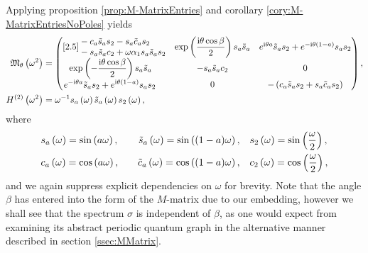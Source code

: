 Applying proposition \ref{prop:M-MatrixEntries} and corollary \ref{cory:M-MatrixEntriesNoPoles} yields
\begin{align*} 
	\mathfrak{M}_\theta\left( \omega^2 \right) &=
	\begin{pmatrix}[2.5]
		\begin{split}
			&-c_a \tilde{s}_a s_2 
			- s_a \tilde{c}_a s_2  \\
			&- s_a \tilde{s}_a c_2
			+ \omega\alpha_1 s_a \tilde{s}_a s_2
		\end{split} &
		\exp\left( \dfrac{\mathrm{i}\theta\cos\beta}{2} \right)s_a \tilde{s}_a &
		e^{\mathrm{i}\theta a}\tilde{s}_a s_2 + e^{-\mathrm{i}\theta(1-a)}s_a s_2 \\
		\begin{split}		
			& \exp\left( -\dfrac{\mathrm{i}\theta\cos\beta}{2} \right)s_a \tilde{s}_a 
		\end{split} &
		-s_a \tilde{s}_a c_2 &
		0 \\
		\begin{split}
			& e^{-\mathrm{i}\theta a}\tilde{s}_a s_2 + e^{\mathrm{i}\theta(1-a)}s_a s_2 
		\end{split} &
		0 &
		-\left( c_a \tilde{s}_a s_2 + s_a \tilde{c}_a s_2 \right)
	\end{pmatrix}, \\
	H^{(2)}\left( \omega^2 \right) &= \omega^{-1} s_a\left( \omega \right) \tilde{s}_a\left( \omega \right) s_2\left( \omega \right),
\end{align*}
where
\begin{alignat*}{3}
	& s_a\left( \omega \right) = \sin\left( a\omega \right), \quad
	& \tilde{s}_a\left( \omega \right) = \sin\left( (1-a)\omega \right), \quad
	& s_2\left( \omega \right) = \sin\left( \frac{\omega}{2} \right), \\
	& c_a\left( \omega \right) = \cos\left( a\omega \right), \quad
	& \tilde{c}_a\left( \omega \right) = \cos\left( (1-a)\omega \right), \quad
	& c_2\left( \omega \right) = \cos\left( \frac{\omega}{2} \right),
\end{alignat*}
and we again suppress explicit dependencies on $\omega$ for brevity.
Note that the angle $\beta$ has entered into the form of the $M$-matrix due to our embedding, however we shall see that the spectrum $\sigma$ is independent of $\beta$, as one would expect from examining its abstract periodic quantum graph in the alternative manner described in section \ref{ssec:MMatrix}.

